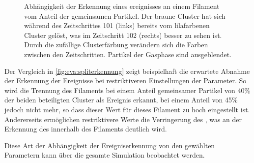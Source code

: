 \begin{figure}
	{\caption{Abhängigkeit der Erkennung eines ereignisses an einem Filament vom Anteil der gemeinsamen Partikel. Der braune Cluster hat sich während des Zeitschrittes 101 (links) bereits vom lilafarbenen Cluster gelöst, was im Zeitschritt 102 (rechts) besser zu sehen ist. Durch die zufällige Clusterfärbung verändern sich die Farben zwischen den Zeitschritten. Partikel der Gasphase sind ausgeblendet.}\label{fig:eva:spliterkennung}}
\end{figure}

Der Vergleich in \autoref{fig:eva:spliterkennung} zeigt beispielhaft die erwartete Abnahme der Erkennung der Ereignisse bei restriktiveren Einstellungen der Parameter. So wird die Trennung des Filaments bei einem Anteil gemeinsamer Partikel von 40\% der beiden beteiligten Cluster als Ereignis erkannt, bei einem Anteil von 45\% jedoch nicht mehr, so dass dieser Wert für dieses Filament zu hoch eingestellt ist.
Andererseits ermöglichen restriktivere Werte die Verringerung des , was an der Erkennung des  innerhalb des Filaments deutlich wird.

Diese Art der Abhängigkeit der Ereigniserkennung von den gewählten Parametern kann über die gesamte Simulation beobachtet werden.

